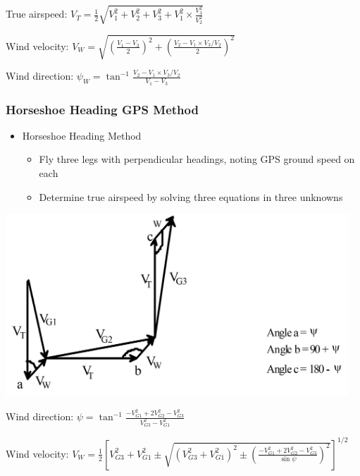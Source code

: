 \documentclass[
]{book}
\providecommand{\tightlist}{%
  \setlength{\itemsep}{0pt}\setlength{\parskip}{0pt}}
\begin{document}
True airspeed: \(V_T = \frac{1}{2} \sqrt{V_1^2 + V_2^2 + V_3^2 + V_1^2 \times \frac{V_3^2}{V_2^2}}\)

Wind velocity: \(V_W = \sqrt{\left( \frac{V_1 - V_3}{2} \right)^2 + \left( \frac{V_2 - V_1 \times V_3 / V_2}{2} \right) ^2 }\)

Wind direction: \(\psi_W = \tan^{-1} \frac{V_2 - V_1 \times V_3 / V_2}{V_1 - V_3}\)

\hypertarget{horseshoe-heading-gps-method}{%
\subsubsection*{Horseshoe Heading GPS Method}\label{horseshoe-heading-gps-method}}

\begin{itemize}
\tightlist
\item
  Horseshoe Heading Method

  \begin{itemize}
  \tightlist
  \item
    Fly three legs with perpendicular headings, noting GPS ground speed on each
  \item
    Determine true airspeed by solving three equations in three unknowns
  \end{itemize}
\end{itemize}

\includegraphics[width=5.0625in,height=2.6875in]{media/04/image31.png}

Wind direction: \(\psi = \tan^{-1} \frac{-V_{G1}^2 + 2V_{G2}^2 - V_{G3}^2}{V_{G3}^2 - V_{G1}^2}\)

Wind velocity: \(V_W = \frac{1}{2} \left[ V_{G3}^2 + V_{G1}^2 \pm \sqrt{ \left(V_{G3}^2 + V_{G1}^2 \right)^2 \pm \left( \frac{-V_{G1}^2 + 2V_{G2}^2 - V_{G3}^2}{\sin{\psi}} \right)^2 } \right]^{1/2}\)
\end{document}
